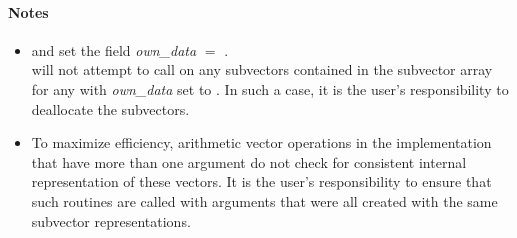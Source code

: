 \paragraph{\bf Notes}

\begin{itemize}

\item
  {\warn} and  set
  the field {\em own\_data} $=$ .  \\
   will not attempt to call
   on any subvectors contained in the subvector array
  for any  with {\em own\_data} set to . In
  such a case, it is the user's responsibility to deallocate the
  subvectors.

\item
  {\warn}To maximize efficiency, arithmetic vector operations in the
  {\nvecmpimanyvector} implementation that have more than one
   argument do not check for consistent internal
  representation of these vectors. It is the user's responsibility to
  ensure that such routines are called with  arguments
  that were all created with the same subvector representations.

\end{itemize}
